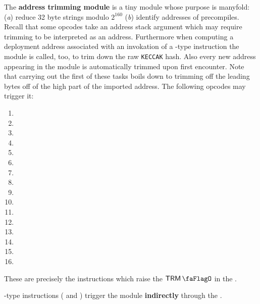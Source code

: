 The \textbf{address trimming module} is a tiny module whose purpose is manyfold:
(\emph{a})
reduce 32 byte strings modulo $2^{160}$
(\emph{b})
identify addresses of precompiles.
Recall that some opcodes take an address stack argument which may require trimming to be interpreted as an address.
Furthermore when computing a deployment address associated with an invokation of a -type instruction the \rlpAddrMod{} module is called, too, to trim down the raw \texttt{KECCAK} hash.
Also every new address appearing in the \hubMod{} module is automatically trimmed upon first encounter.
Note that carrying out the first of these tasks boils down to trimming off the leading bytes off of the high part of the imported address. The following opcodes may trigger it:
\begin{multicols}{4}
	\begin{enumerate}
		\item {}
		\item[\vspace{\fill}]
		\item[\vspace{\fill}]
		\item[\vspace{\fill}]
		\item {}
		\item {}
		\item {}
		\item[\vspace{\fill}]
		\item {}
		\item {}
		\item {}
		\item {}
		\item {}
		\item[\vspace{\fill}]
		\item[\vspace{\fill}]
		\item[\vspace{\fill}]
	\end{enumerate}
\end{multicols}
These are precisely the instructions which raise the $\trmFlag$ in the \hubMod{}.

\saNote{} -type instructions ( and ) trigger the \trmMod{} module \textbf{indirectly} through the \rlpAddrMod{}.
